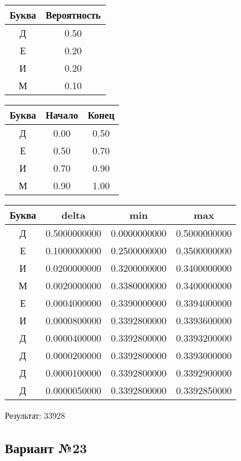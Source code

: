 \documentclass[a4paper, 12pt]{article}
\begin{document}
\begin{center}
 \begin{tabular}{ |c|c| } 
  \hline
     Буква & Вероятность \\ \hline
Д & 0.50\\\hline
Е & 0.20\\\hline
И & 0.20\\\hline
М & 0.10
\\ \hline \end{tabular}
\end{center}
\begin{center}
 \begin{tabular}{ |c|c|c| } 
  \hline
     Буква & Начало & Конец \\ \hline
Д & 0.00 & 0.50\\\hline
Е & 0.50 & 0.70\\\hline
И & 0.70 & 0.90\\\hline
М & 0.90 & 1.00
\\ \hline \end{tabular}
\end{center}
\begin{center}
 \begin{tabular}{ |c|c|c|c| } 
  \hline
     Буква & delta & min & max \\ \hline
Д & 0.5000000000 & 0.0000000000 & 0.5000000000\\\hline
Е & 0.1000000000 & 0.2500000000 & 0.3500000000\\\hline
И & 0.0200000000 & 0.3200000000 & 0.3400000000\\\hline
М & 0.0020000000 & 0.3380000000 & 0.3400000000\\\hline
Е & 0.0004000000 & 0.3390000000 & 0.3394000000\\\hline
И & 0.0000800000 & 0.3392800000 & 0.3393600000\\\hline
Д & 0.0000400000 & 0.3392800000 & 0.3393200000\\\hline
Д & 0.0000200000 & 0.3392800000 & 0.3393000000\\\hline
Д & 0.0000100000 & 0.3392800000 & 0.3392900000\\\hline
Д & 0.0000050000 & 0.3392800000 & 0.3392850000
\\ \hline \end{tabular}
\end{center}
Результат: 33928
\pagebreak
\subsection{Вариант №23}
\end{document}
